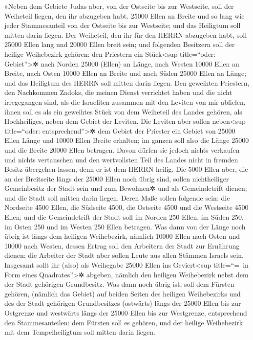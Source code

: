 »Neben dem Gebiete Judas aber, von der Ostseite bis zur
Westseite, soll der Weiheteil liegen, den ihr abzugeben habt. 25000
Ellen an Breite und so lang wie jeder Stammesanteil von der Ostseite bis
zur Westseite; und das Heiligtum soll mitten darin liegen.
Der Weiheteil, den ihr für den HERRN abzugeben habt, soll
25000 Ellen lang und 20000 Ellen breit sein; und
folgenden Besitzern soll der heilige Weihebezirk gehören: den Priestern
ein Stück\textless sup title=``oder: Gebiet''\textgreater✲ nach Norden
25000 (Ellen) an Länge, nach Westen 10000 Ellen an Breite, nach Osten
10000 Ellen an Breite und nach Süden 25000 Ellen an Länge; und das
Heiligtum des HERRN soll mitten darin liegen. Den
geweihten Priestern, den Nachkommen Zadoks, die meinen Dienst verrichtet
haben und die nicht irregegangen sind, als die Israeliten zusammen mit
den Leviten von mir abfielen, ihnen soll es als ein
geweihtes Stück von dem Weiheteil des Landes gehören, als Hochheiliges,
neben dem Gebiet der Leviten. Die Leviten aber sollen
neben\textless sup title=``oder: entsprechend''\textgreater✲ dem Gebiet
der Priester ein Gebiet von 25000 Ellen Länge und 10000 Ellen Breite
erhalten; im ganzen soll also die Länge 25000 und die Breite 20000 Ellen
betragen. Davon dürfen sie jedoch nichts verkaufen und
nichts vertauschen und den wertvollsten Teil des Landes nicht in fremden
Besitz übergehen lassen, denn er ist dem HERRN heilig.
Die 5000 Ellen aber, die an der Breitseite längs der
25000 Ellen noch übrig sind, sollen nichtheiliger Gemeinbesitz der Stadt
sein und zum Bewohnen✲ und als Gemeindetrift dienen; und die Stadt soll
mitten darin liegen. Deren Maße sollen folgende sein: die
Nordseite 4500 Ellen, die Südseite 4500, die Ostseite 4500 und die
Westseite 4500 Ellen; und die Gemeindetrift der Stadt
soll im Norden 250 Ellen, im Süden 250, im Osten 250 und im Westen 250
Ellen betragen. Was dann von der Länge noch übrig ist
längs dem heiligen Weihebezirk, nämlich 10000 Ellen nach Osten und 10000
nach Westen, dessen Ertrag soll den Arbeitern der Stadt zur Ernährung
dienen; die Arbeiter der Stadt aber sollen Leute aus
allen Stämmen Israels sein. Insgesamt sollt ihr (also)
als Weihegabe 25000 Ellen ins Geviert\textless sup title=``=~in Form
eines Quadrates''\textgreater✲ abgeben, nämlich den heiligen Weihebezirk
nebst dem der Stadt gehörigen Grundbesitz. Was dann noch
übrig ist, soll dem Fürsten gehören, (nämlich das Gebiet) auf beiden
Seiten des heiligen Weihebezirks und des der Stadt gehörigen
Grundbesitzes (ostwärts) längs der 25000 Ellen bis zur Ostgrenze und
westwärts längs der 25000 Ellen bis zur Westgrenze, entsprechend den
Stammesanteilen: dem Fürsten soll es gehören, und der heilige
Weihebezirk mit dem Tempelheiligtum soll mitten darin liegen.

